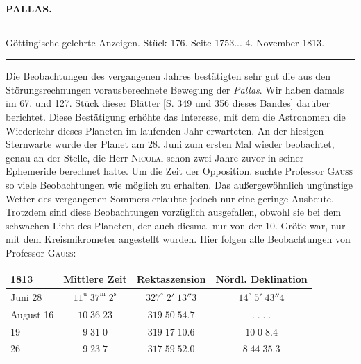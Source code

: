 \clearpage{}\hypertarget{native-374-lower}{}\label{native-374-lower}
\begin{center}\textbf{PALLAS.}\par\vspace{4pt}\hrule\vspace{4pt}\fontsize{10}{12}\selectfont Göttingische gelehrte Anzeigen. Stück 176. Seite 1753\;... 4. November 1813.\par\vspace{4pt}\hrule\vspace{4pt}\end{center}

\par\indent Die Beobachtungen des vergangenen Jahres bestätigten sehr gut die aus den Störungsrechnungen vorausberechnete Bewegung der \emph{Pallas}. Wir haben damals im 67. und 127. Stück dieser Blätter [S. 349 und 356 dieses Bandes] darüber berichtet. Diese Bestätigung erhöhte das Interesse, mit dem die Astronomen die Wiederkehr dieses Planeten im laufenden Jahr erwarteten. An der hiesigen Sternwarte wurde der Planet am 28. Juni zum ersten Mal wieder beobachtet, genau an der Stelle, die Herr \textsc{Nicolai} schon zwei Jahre zuvor in seiner Ephemeride berechnet hatte. Um die Zeit der Opposition. suchte Professor \textsc{Gauss} so viele Beobachtungen wie möglich zu erhalten. Das außergewöhnlich ungünstige Wetter des vergangenen Sommers erlaubte jedoch nur eine geringe Ausbeute. Trotzdem sind diese Beobachtungen vorzüglich ausgefallen, obwohl sie bei dem schwachen Licht des Planeten, der auch diesmal nur von der 10. Größe war, nur mit dem Kreismikrometer angestellt wurden. Hier folgen alle Beobachtungen von Professor \textsc{Gauss}:

\begin{center}\fontsize{10}{12}\selectfont\setlength{\tabcolsep}{5pt}\renewcommand{\arraystretch}{1.15}\begin{tabular}{l|c|c|c}
1813 & Mittlere Zeit & Rektaszension & Nördl. Deklination\\\hline
Juni 28 & $11^{\mathrm u}\;37^{\mathrm m}\;2^{\mathrm s}$ & $327^\circ\;2'\;13''3$ & $14^\circ\;5'\;43''4$\\
August 16 & $10\;36\;23$ & $319\;50\;54.7$ & $.\;.\;.\;.$\\
19 & $9\;31\;0$ & $319\;17\;10.6$ & $10\;0\;8.4$\\
26 & $9\;23\;7$ & $317\;59\;52.0$ & $8\;44\;35.3$\\
\end{tabular}\end{center}

